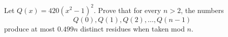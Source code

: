 Let $Q\left(x\right)=420\left(x^2-1\right)^2$. Prove that for every $n>2$, the numbers \[Q\left(0\right),Q\left(1\right),Q\left(2\right),\ldots,Q\left(n-1\right)\] produce at most $0.499n$ distinct residues when taken mod $n$.